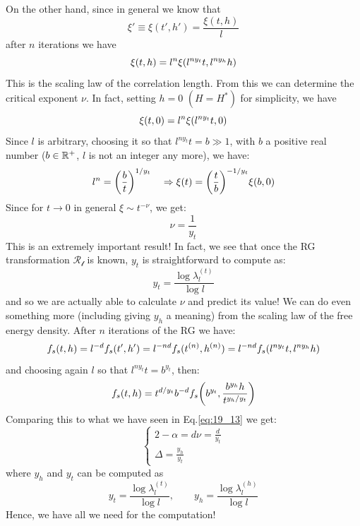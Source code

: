\documentclass[../main/main.tex]{subfiles}
\begin{document}
On the other hand, since in general we know that
\begin{equation*}
  \xi' \equiv \xi (t',h') = \frac{\xi (t,h)}{l}
\end{equation*}
after \( n \) iterations we have
\begin{equation}
  \xi (t,h) = l^n \xi \qty(l^{n y_t} t, l^{n y_h} h)
\end{equation}
This is the scaling law of the correlation length. From this we can determine the critical exponent \( \nu  \).  In fact, setting \( h=0 \) \( (H=H^*) \) for simplicity, we have
\begin{equation*}
  \xi (t,0) = l^n \xi \qty(l^{n y_t} t , 0)
\end{equation*}
Since \( l \) is arbitrary, choosing it  so that \( l^{n y_t} t = b \gg 1\), with \( b \)  a positive real number (\( b \in \mathbb{R}^+ \), \( l \) is not an integer any more), we have:
\begin{equation*}
  l^n = \qty(\frac{b}{t})^{1/y_t} \quad   \Rightarrow \xi (t) = \qty(\frac{t}{b})^{-1/y_t} \xi (b,0)
\end{equation*}
Since for \( t \rightarrow 0 \) in general \( \xi \sim t^{-\nu } \), we get:
\begin{equation}
  \nu = \frac{1}{y_t}
\end{equation}
This is an extremely important result! In fact, we see that once the RG transformation \( \mathcal{R_l} \) is known, \( y_t \) is straightforward to compute as:
\begin{equation*}
  y_t  = \frac{ \log{\lambda _l^{(t)}}}{\log{l} }
\end{equation*}
and so we are actually able to calculate \( \nu  \) and predict its value! We can do even something more (including giving \( y_h \) a meaning) from the scaling law of the free energy density. After \( n \) iterations of the RG we have:
\begin{equation}
f_s (t,h)  = l^{-d} f_s (t',h') = l^{-nd} f_s (t^{(n)},h^{(n)})
 = l^{-nd} f_s \qty(l^{n y_t}t, l^{n y_h}h)
\end{equation}
and choosing again \( l \) so that  \( l^{n y_t} t= b^{y_t} \), then:
\begin{equation*}
  f_s (t,h) = t^{d/y_t} b^{-d} f_s \qty(b^{y_t}, \frac{b^{y_h}h}{t^{y_h/y_t}})
\end{equation*}
Comparing this to what we have seen in Eq.\eqref{eq:19_13} we get:
\begin{equation}
  \begin{cases}
   2 - \alpha = d \nu = \frac{d}{y_t}\\
   \Delta = \frac{y_h}{y_t}
  \end{cases}
\end{equation}
where \( y_h \) and \( y_t \) can be computed as
\begin{equation}
  y_t  = \frac{\log{\lambda _l^{(t)}}}{\log{l} }, \qquad y_h = \frac{\log{\lambda _l^{(h)}}}{\log{l} }
\end{equation}
Hence, we have all we need for the computation!
\end{document}

